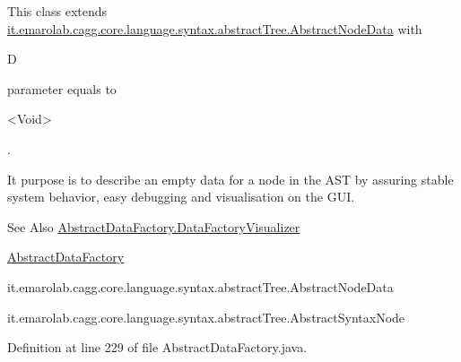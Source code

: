 This class extends \hyperlink{}{it.\-emarolab.\-cagg.\-core.\-language.\-syntax.\-abstract\-Tree.\-Abstract\-Node\-Data} with
\begin{DoxyCode}
D 
\end{DoxyCode}
 parameter equals to
\begin{DoxyCode}
<Void> 
\end{DoxyCode}
 .\par
 It purpose is to describe an empty data for a node in the A\-S\-T by assuring stable system behavior, easy debugging and visualisation on the G\-U\-I. 

\begin{DoxySeeAlso}{See Also}
\hyperlink{classit_1_1emarolab_1_1cagg_1_1core_1_1language_1_1syntax_1_1abstractTree_1_1AbstractDataFactory_1_1DataFactoryVisualizer}{Abstract\-Data\-Factory.\-Data\-Factory\-Visualizer} 

\hyperlink{classit_1_1emarolab_1_1cagg_1_1core_1_1language_1_1syntax_1_1abstractTree_1_1AbstractDataFactory}{Abstract\-Data\-Factory} 

it.\-emarolab.\-cagg.\-core.\-language.\-syntax.\-abstract\-Tree.\-Abstract\-Node\-Data 

it.\-emarolab.\-cagg.\-core.\-language.\-syntax.\-abstract\-Tree.\-Abstract\-Syntax\-Node 
\end{DoxySeeAlso}


Definition at line 229 of file Abstract\-Data\-Factory.\-java.



